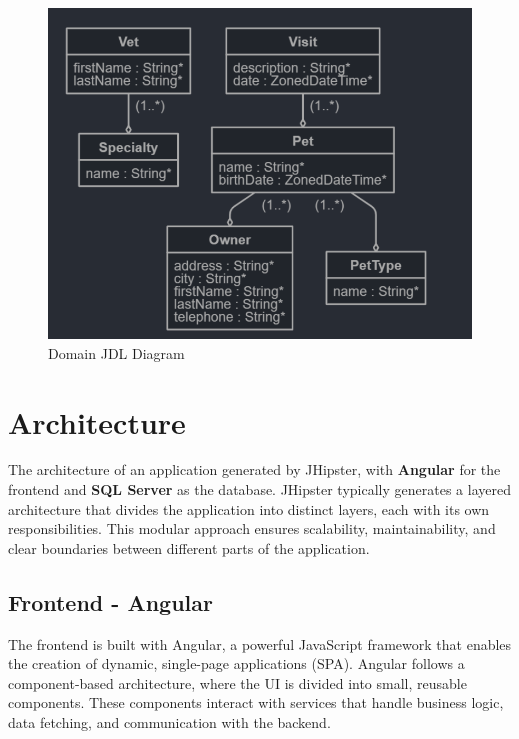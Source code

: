 \documentclass[a4paper,11pt,openright,BCOR=15mm]{scrbook}
\begin{document}
		\begin{figure}[H]
			\begin{center}
				\includegraphics[width=\textwidth]{figs/JDL.png}
				\caption{Domain JDL Diagram}
				\label{fig:Domain JDL Diagram}
				\centering
			\end{center}
		\end{figure}
		
		\section{Architecture}
		
		The architecture of an application generated by JHipster, with \textbf{Angular} for the frontend and \textbf{SQL Server} as the database.
		JHipster typically generates a layered architecture that divides the application into distinct layers, each with its own responsibilities. This modular approach ensures scalability, maintainability, and clear boundaries between different parts of the application.
		
		\subsection{Frontend - Angular}
		The frontend is built with Angular, a powerful JavaScript framework that enables the creation of dynamic, single-page applications (SPA). Angular follows a component-based architecture, where the UI is divided into small, reusable components. These components interact with services that handle business logic, data fetching, and communication with the backend.
		
\end{document}
